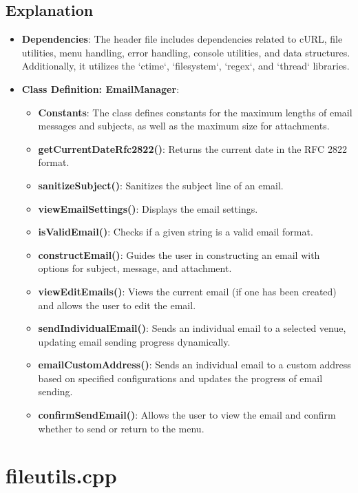 \documentclass{article}
\begin{document}
	\subsection*{Explanation}
	\begin{itemize}
		\item \textbf{Dependencies}: The header file includes dependencies related to cURL, file utilities, menu handling, error handling, console utilities, and data structures. Additionally, it utilizes the `ctime`, `filesystem`, `regex`, and `thread` libraries.
		\item \textbf{Class Definition: EmailManager}:
		\begin{itemize}
			\item \textbf{Constants}: The class defines constants for the maximum lengths of email messages and subjects, as well as the maximum size for attachments.
			\item \textbf{getCurrentDateRfc2822()}: Returns the current date in the RFC 2822 format.
			\item \textbf{sanitizeSubject()}: Sanitizes the subject line of an email.
			\item \textbf{viewEmailSettings()}: Displays the email settings.
			\item \textbf{isValidEmail()}: Checks if a given string is a valid email format.
			\item \textbf{constructEmail()}: Guides the user in constructing an email with options for subject, message, and attachment.
			\item \textbf{viewEditEmails()}: Views the current email (if one has been created) and allows the user to edit the email.			
			\item
			 \textbf{sendIndividualEmail()}: Sends an individual email to a selected venue, updating email sending progress dynamically.
			\item \textbf{emailCustomAddress()}: Sends an individual email to a custom address based on specified configurations and updates the progress of email sending.
			\item \textbf{confirmSendEmail()}: Allows the user to view the email and confirm whether to send or return to the menu.
			
		\end{itemize}
	\end{itemize}
	
	\section{fileutils.cpp}
	
\end{document}
